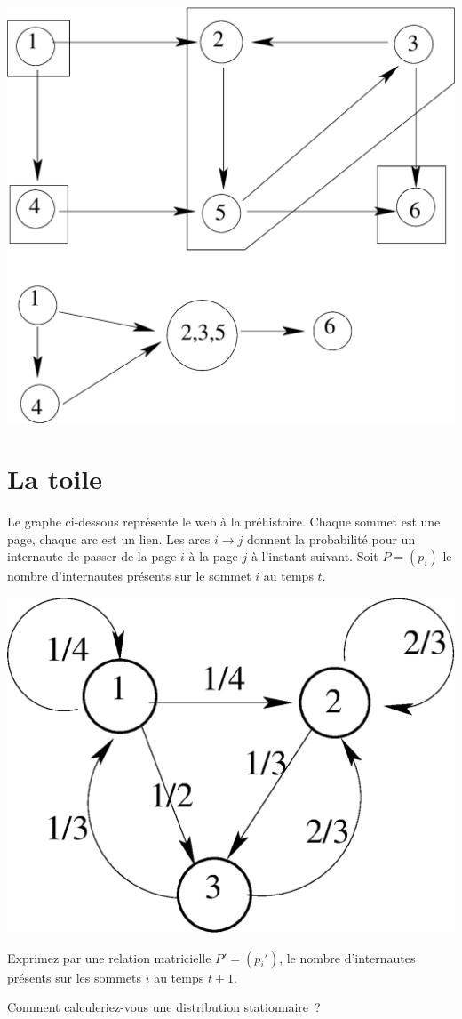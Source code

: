 \documentclass[11pt]{article}
\begin{document}
\begin{center}
\includegraphics[width=0.5\linewidth]{cfc_bis.eps}
\end{center}
\newpage
{
\section{La toile}
Le graphe ci-dessous représente le web à la préhistoire.
Chaque sommet est une page, chaque arc est un lien. 
Les arcs $i\rightarrow j$ donnent la probabilité pour un internaute
de passer de la page $i$ à la page $j$ à l'instant suivant.
Soit $P=(p_i)$ le nombre d'internautes présents sur le sommet $i$ au temps $t$.
\begin{center}
\includegraphics[width=0.5\linewidth]{markov.eps}
\end{center}

Exprimez par une relation matricielle $P'=(p_i')$,  le  nombre d'internautes présents sur les sommets $i$  au temps $t+1$.

Comment calculeriez-vous une distribution stationnaire~?
}
\end{document}
